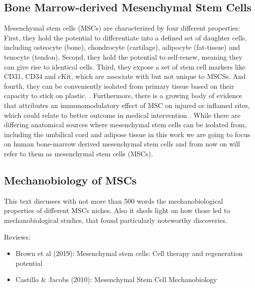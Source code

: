 \subsection{Bone Marrow-derived Mesenchymal Stem Cells}

Mesenchymal stem cells (MSCs) are characterized by four different properties: First, they hold the potential to differentiate into a defined set of daughter cells, including osteocyte (bone), chondrocyte (cartilage), adipocyte (fat-tissue) and tenocyte (tendon).\cite{Ng2008} Second, they hold the potential to self-renew, meaning they can give rise to identical cells. Third, they expose a set of stem cell markers like CD31, CD34 and cKit, which are associate with but not unique to MSCSs. \cite{Battula2009} And fourth, they can be conveniently isolated from primary tissue based on their capacity to stick on plastic. \cite{Buhring2007}. Furthermore, there is a growing body of evidence that attributes an immunomodulatory effect of MSC on injured or inflamed sites, which could relate to better outcome in medical intervention \cite{Caplan2011, Hass2011}.
While there are differing anatomical sources where mesenchymal stem cells can be isolated from, including the umbilical cord and adipose tissue \cite{Barlow2008, Hass2011} in this work we are going to focus on human bone-marrow derived mesenchymal stem cells and from now on will refer to them as mesenchymal stem cells (MSCs).

\subsection{Mechanobiology of MSCs}

This text discusses with not more than 500 words the mechanobiological properties of different MSCs niches. Also it sheds light on how those led to mechanobiological studies, that found particularly noteworthy discoveries. \par

Reviews:
\begin{itemize}
	\item Brown et al (2019): Mesenchymal stem cells: Cell therapy and regeneration potential
	\item Castillo \& Jacobs (2010): Mesenchymal Stem Cell Mechanobiology
\end{itemize}


